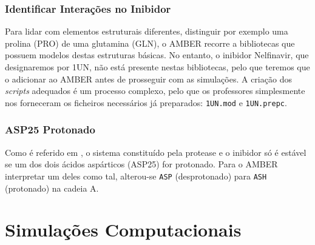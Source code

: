 \documentclass[12pt,a4paper]{article}
\begin{document}
\subsubsection{Identificar Interações no Inibidor}\label{sec:vis:inibidor}
	Para lidar com elementos estruturais diferentes, distinguir por exemplo uma prolina (PRO) de uma glutamina (GLN), o AMBER recorre a bibliotecas que possuem modelos destas estruturas básicas. No entanto, o inibidor Nelfinavir, que designaremos por 1UN, não está presente nestas bibliotecas, pelo que teremos que o adicionar ao AMBER antes de prosseguir com as simulações. A criação dos \textit{scripts} adequados é um processo complexo, pelo que os professores simplesmente nos forneceram os ficheiros necessários já preparados: \verb|1UN.mod| e \verb|1UN.prepc|.
	
\subsubsection{ASP25 Protonado}
	Como é referido em \cite{soaresDatasetShowingImpact2016,perezSubstrateRecognitionHIV12010}, o sistema constituído pela protease e o inibidor só é estável se um dos dois ácidos aspárticos (ASP25) for protonado. Para o AMBER interpretar um deles como tal, alterou-se \verb|ASP| (desprotonado) para \verb|ASH| (protonado) na cadeia A.
	
	
	
	
	
\section{Simulações Computacionais}
	
\end{document}
